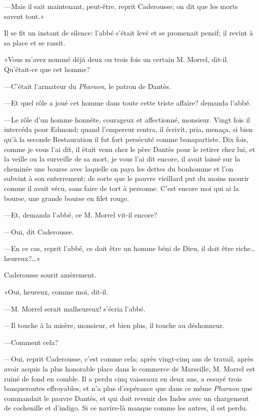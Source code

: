 —Mais il sait maintenant, peut-être, reprit Caderousse; on dit que les morts savent tout.»

Il se fit un instant de silence: l'abbé s'était levé et se promenait pensif; il revint à sa place et se rassit.

«Vous m'avez nommé déjà deux ou trois fois un certain M. Morrel, dit-il. Qu'était-ce que cet homme?

—C'était l'armateur du \textit{Pharaon}, le patron de Dantès.

—Et quel rôle a joué cet homme dans toute cette triste affaire? demanda l'abbé.

—Le rôle d'un homme honnête, courageux et affectionné, monsieur. Vingt fois il intercéda pour Edmond; quand l'empereur rentra, il écrivit, pria, menaça, si bien qu'à la seconde Restauration il fut fort persécuté comme bonapartiste. Dix fois, comme je vous l'ai dit, il était venu chez le père Dantès pour le retirer chez lui, et la veille ou la surveille de sa mort, je vous l'ai dit encore, il avait laissé sur la cheminée une bourse avec laquelle on paya les dettes du bonhomme et l'on subvint à son enterrement; de sorte que le pauvre vieillard put du moins mourir comme il avait vécu, sans faire de tort à personne. C'est encore moi qui ai la bourse, une grande bourse en filet rouge.

—Et, demanda l'abbé, ce M. Morrel vit-il encore?

—Oui, dit Caderousse.

—En ce cas, reprit l'abbé, ce doit être un homme béni de Dieu, il doit être riche\dots heureux?\dots»

Caderousse sourit amèrement.

«Oui, heureux, comme moi, dit-il.

—M. Morrel serait malheureux! s'écria l'abbé.

—Il touche à la misère, monsieur, et bien plus, il touche au déshonneur.

—Comment cela?

—Oui, reprit Caderousse, c'est comme cela; après vingt-cinq ans de travail, après avoir acquis la plus honorable place dans le commerce de Marseille, M. Morrel est ruiné de fond en comble. Il a perdu cinq vaisseaux en deux ans, a essuyé trois banqueroutes effroyables, et n'a plus d'espérance que dans ce même \textit{Pharaon} que commandait le pauvre Dantès, et qui doit revenir des Indes avec un chargement de cochenille et d'indigo. Si ce navire-là manque comme les autres, il est perdu.


